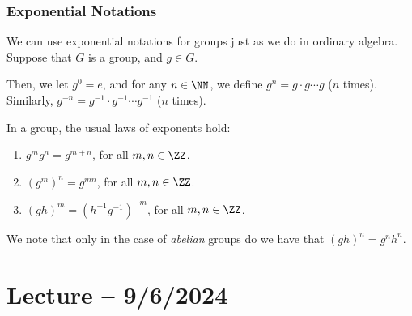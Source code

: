 \documentclass[openany]{book}
\begin{document}
\subsubsection{Exponential Notations}
We can use exponential notations for groups just as we do in ordinary algebra. Suppose that $G$ is a group, and $g \in G$.

Then, we let $g^{0} = e$, and for any $n \in \NN$, we define $g^{n} = g \cdot g \cdots g$ ($n$ times). Similarly, $g^{-n} = g^{-1} \cdot g^{-1} \cdots g^{-1}$ ($n$ times).

\begin{thm}
	In a group, the usual laws of exponents hold:
	\begin{enumerate}
		\item $g^{m}g^{n} = g^{m+n}$, for all $m, n \in \ZZ$.
		\item $(g^{m})^{n} = g^{mn}$, for all $m, n \in \ZZ$.
		\item $(gh)^{m} = (h^{-1}g^{-1})^{-m}$, for all $m, n \in \ZZ$.
	\end{enumerate}
\end{thm}

\begin{warn}
	We note that only in the case of \textit{abelian} groups do we have that $(gh)^{n} = g^{n}h^{n}$.
\end{warn}

\section{Lecture -- 9/6/2024}
\end{document}
